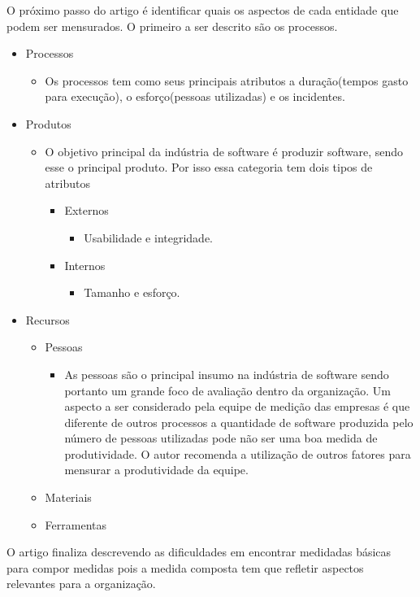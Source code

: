 \documentclass{article}
\begin{document}
O próximo passo do artigo é identificar quais os aspectos de cada entidade que podem ser mensurados. O primeiro a ser descrito são os processos.

\begin{itemize}
\item Processos
    \begin{itemize}
        \item[] Os processos tem como seus principais atributos a duração(tempos gasto para execução), o esforço(pessoas utilizadas) e os incidentes.  
    \end{itemize}

\item Produtos
    \begin{itemize}
        \item[] O objetivo principal da indústria de software é produzir software, sendo esse o principal produto. Por isso essa categoria tem dois tipos de atributos
    \begin{itemize}
        \item Externos
            \begin{itemize}
            \item[] Usabilidade e integridade.
            \end{itemize}
        \item Internos
            \begin{itemize}
            \item[] Tamanho e esforço.
            \end{itemize}
    \end{itemize}
    \end{itemize}


\item Recursos
    \begin{itemize}
        \item[] Pessoas 
            \begin{itemize}
                \item[] As pessoas são o principal insumo na indústria de software sendo portanto um grande foco de avaliação dentro da organização. Um aspecto a ser considerado pela equipe de medição das empresas é que diferente de outros processos a quantidade de software produzida pelo número de pessoas utilizadas pode não ser uma boa medida de produtividade. O autor recomenda a utilização de outros fatores para mensurar a produtividade da equipe. 
            \end{itemize}
        \item[] Materiais
        \item[] Ferramentas
    \end{itemize}
\end{itemize} 

O artigo finaliza descrevendo as dificuldades em encontrar medidadas básicas para compor medidas pois a medida composta tem que refletir aspectos relevantes para a organização. 
\end{document}

